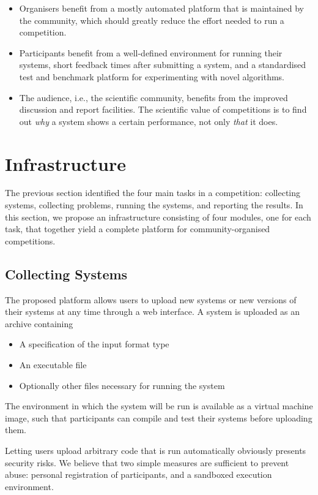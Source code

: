 \begin{itemize}
  \item Organisers benefit from a mostly automated platform that is maintained by the community, which should greatly reduce the effort needed to run a competition.
  \item Participants benefit from a well-defined environment for running their systems, short feedback times after submitting a system, and a standardised test and benchmark platform for experimenting with novel algorithms.
  \item The audience, i.e., the scientific community, benefits from the improved discussion and report facilities. The scientific value of competitions is to find out \emph{why} a system shows a certain performance, not only \emph{that} it does.
\end{itemize}

\section{Infrastructure}
\label{sec:infrastructure}

The previous section identified the four main tasks in a competition: collecting systems, collecting problems, running the systems, and reporting the results. In this section, we propose an infrastructure consisting of four modules, one for each task, that together yield a complete platform for community-organised competitions.

\subsection{Collecting Systems}

The proposed platform allows users to upload new systems or new versions of their systems at any time through a web interface. A system is uploaded as an archive containing
\begin{itemize}
  \item A specification of the input format type
  \item An executable file
  \item Optionally other files necessary for running the system
\end{itemize}

The environment in which the system will be run is available as a virtual machine image, such that participants can compile and test their systems before uploading them.

Letting users upload arbitrary code that is run automatically obviously presents security risks. We believe that two simple measures are sufficient to prevent abuse: personal registration of participants, and a sandboxed execution environment.

